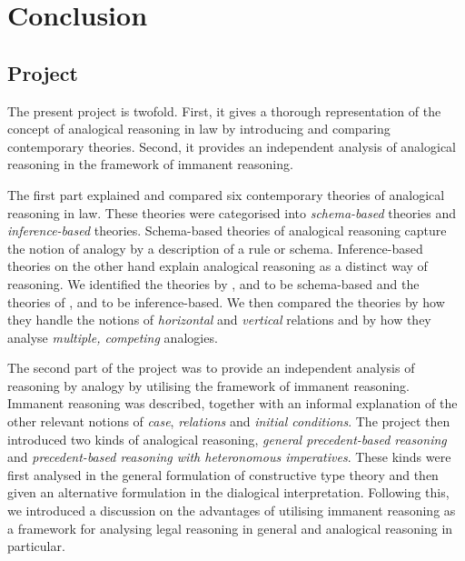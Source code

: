 \chapter{Conclusion}

	\section{Project}
	
		The present project is twofold. First, it gives a thorough representation of the concept of analogical reasoning in law by introducing and comparing contemporary theories. Second, it provides an independent analysis of analogical reasoning in the framework of immanent reasoning. 
		
		The first part explained and compared six contemporary theories of analogical reasoning in law. These theories were categorised into \textit{schema-based} theories and \textit{inference-based} theories. Schema-based theories of analogical reasoning capture the notion of analogy by a description of a rule or schema. Inference-based theories on the other hand explain analogical reasoning as a distinct way of reasoning. We identified the theories by \textcite{Brewer1996}, \textcite{alchourron1991argumentos} and \textcite{woods2015legal} to be schema-based and the theories of \textcite{Bartha2010}, \textcite{Prakken1996} and \textcite{Rahman2017} to be inference-based. We then compared the theories by how they handle the notions of \textit{horizontal} and \textit{vertical} relations and by how they analyse \textit{multiple, competing} analogies. 
		
		The second part of the project was to provide an independent analysis of reasoning by analogy by utilising the framework of immanent reasoning. Immanent reasoning was described, together with an informal explanation of the other relevant notions of \textit{case}, \textit{relations} and \textit{initial conditions}. The project then introduced two kinds of analogical reasoning, \textit{general precedent-based reasoning} and \textit{precedent-based reasoning with heteronomous imperatives}. These kinds were first analysed in the general formulation of constructive type theory and then given an alternative formulation in the dialogical interpretation. Following this, we introduced a discussion on the advantages of utilising immanent reasoning as a framework for analysing legal reasoning in general and analogical reasoning in particular.
	

